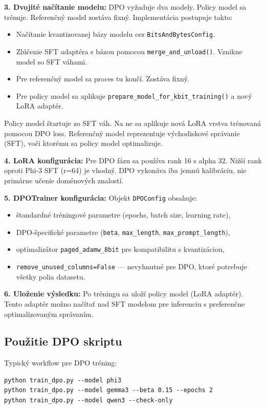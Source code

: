 \textbf{3. Dvojité načítanie modelu:} DPO vyžaduje dva modely. Policy model sa trénuje. Referenčný model zostáva fixný. Implementácia postupuje takto:
\begin{itemize}
    \item Načítanie kvantizovanej bázy modelu cez \texttt{BitsAndBytesConfig}.
    \item Zlúčenie SFT adaptéra s bázou pomocou \texttt{merge\_and\_unload()}. Vznikne model so SFT váhami.
    \item Pre referenčný model sa proces tu končí. Zostáva fixný.
    \item Pre policy model sa aplikuje \texttt{prepare\_model\_for\_kbit\_training()} a nový LoRA adaptér.
\end{itemize}
 
Policy model štartuje zo SFT váh. Na ne sa aplikuje nová LoRA vrstva trénovaná pomocou DPO loss. Referenčný model reprezentuje východiskové správanie (SFT), voči ktorému sa policy model optimalizuje.
 
\textbf{4. LoRA konfigurácia:} Pre DPO fázu sa používa rank 16 s alpha 32. Nižší rank oproti Phi-3 SFT (r=64) je vhodný. DPO vykonáva iba jemnú kalibráciu, nie primárne učenie doménových znalostí.
 
\textbf{5. DPOTrainer konfigurácia:} Objekt \texttt{DPOConfig} obsahuje:
\begin{itemize}
    \item štandardné tréningové parametre (epochs, batch size, learning rate),
    \item DPO-špecifické parametre (\texttt{beta}, \texttt{max\_length}, \texttt{max\_prompt\_length}),
    \item optimalizátor \texttt{paged\_adamw\_8bit} pre kompatibilitu s kvantizáciou,
    \item \texttt{remove\_unused\_columns=False} — nevyhnutné pre DPO, ktoré potrebuje všetky polia datasetu.
\end{itemize}
 
\textbf{6. Uloženie výsledku:} Po tréningu sa uloží policy model (LoRA adaptér). Tento adaptér možno načítať nad SFT modelom pre inferenciu s preferenčne optimalizovaným správaním.
 
\subsection{Použitie DPO skriptu}
 
Typický workflow pre DPO tréning:
\begin{verbatim}
python train_dpo.py --model phi3
python train_dpo.py --model gemma3 --beta 0.15 --epochs 2
python train_dpo.py --model qwen3 --check-only
\end{verbatim}
 

